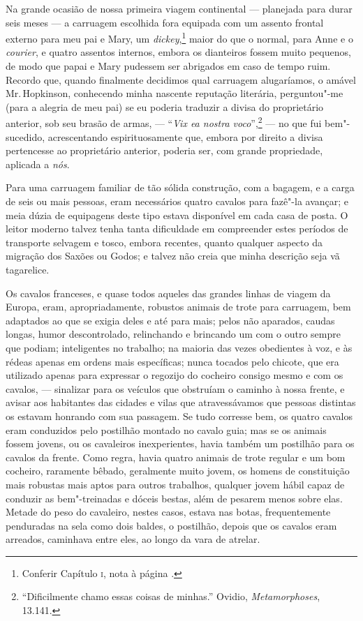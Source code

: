 Na grande ocasião de nossa primeira viagem continental --- planejada
para durar seis meses --- a carruagem escolhida fora equipada com um
assento frontal externo para meu pai e Mary, um \textit{dickey},\footnote{Conferir
  Capítulo \textsc{i}, nota à página \pageref{dickey}.} maior do que o normal, para
Anne e o \textit{courier}, e quatro assentos internos, embora os
dianteiros fossem muito pequenos, de modo que papai e Mary pudessem ser
abrigados em caso de tempo ruim. Recordo que, quando finalmente
decidimos qual carruagem alugaríamos, o amável Mr.\,Hopkinson, conhecendo
minha nascente reputação literária, perguntou"-me (para a alegria de meu
pai) se eu poderia traduzir a divisa do proprietário anterior, sob seu
brasão de armas, --- ``\textit{Vix ea nostra voco}'',\footnote{``Dificilmente
  chamo essas coisas de minhas.'' Ovidio, \textit{Metamorphoses}, 13.141.} --- no que fui bem"-sucedido, acrescentando
espirituosamente que, embora por direito a divisa pertencesse ao
proprietário anterior, poderia ser, com grande propriedade, aplicada a
\textit{nós}.

Para uma carruagem familiar de tão sólida construção, com a
bagagem, e a carga de seis ou mais pessoas, eram necessários quatro
cavalos para fazê"-la avançar; e meia dúzia de equipagens deste tipo
estava disponível em cada casa de posta. O leitor moderno talvez tenha
tanta dificuldade em compreender estes períodos de transporte selvagem e
tosco, embora recentes, quanto qualquer aspecto da migração dos Saxões
ou Godos; e talvez não creia que minha descrição seja vã tagarelice.

Os cavalos franceses, e quase todos aqueles das grandes linhas de viagem
da Europa, eram, apropriadamente, robustos animais de trote para
carruagem, bem adaptados ao que se exigia deles e até para mais; pelos
não aparados, caudas longas, humor descontrolado, relinchando e
brincando um com o outro sempre que podiam; inteligentes no trabalho; na
maioria das vezes obedientes à voz, e às rédeas apenas em ordens mais
específicas; nunca tocados pelo chicote, que era utilizado apenas para
expressar o regozijo do cocheiro consigo mesmo e com os cavalos, ---
sinalizar para os veículos que obstruíam o caminho à nossa frente, e
avisar aos habitantes das cidades e vilas que atravessávamos que pessoas
distintas os estavam honrando com sua passagem. Se tudo corresse bem, os
quatro cavalos eram conduzidos pelo postilhão montado no cavalo guia;
mas se os animais fossem jovens, ou os cavaleiros inexperientes, havia
também um postilhão para os cavalos da frente. Como regra, havia quatro
animais de trote regular e um bom cocheiro, raramente bêbado, geralmente
muito jovem, os homens de constituição mais robustas mais aptos para
outros trabalhos, qualquer jovem hábil capaz de conduzir as
bem"-treinadas e dóceis bestas, além de pesarem menos sobre elas. Metade
do peso do cavaleiro, nestes casos, estava nas botas, frequentemente
penduradas na sela como dois baldes, o postilhão, depois que os cavalos
eram arreados, caminhava entre eles, ao longo da vara de atrelar.


